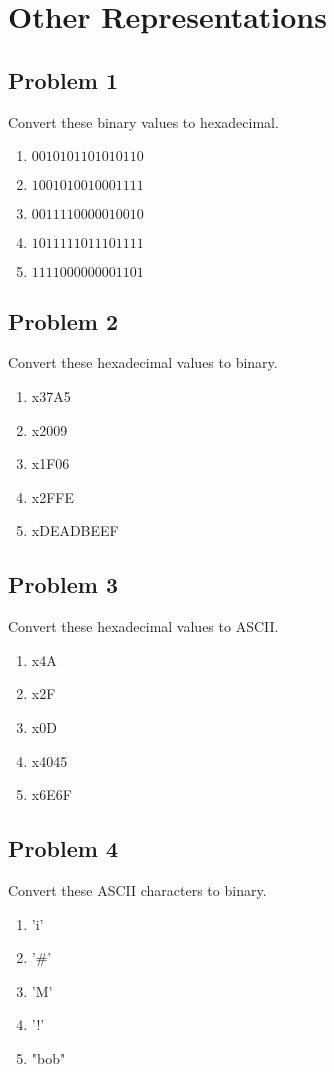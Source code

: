 \documentclass{article}
\begin{document}
\section*{Other Representations}
\subsection*{Problem 1}
Convert these binary values to hexadecimal.
\begin{enumerate}[label=\alph*.]
    \item $0010 1011 0101 0110$
    \item $1001 0100 1000 1111$
    \item $0011 1100 0001 0010$
    \item $1011 1110 1110 1111$
    \item $1111 0000 0000 1101$
\end{enumerate}

\subsection*{Problem 2}
Convert these hexadecimal values to binary.
\begin{enumerate}[label=\alph*.]
    \item x37A5
    \item x2009
    \item x1F06
    \item x2FFE
    \item xDEADBEEF
\end{enumerate}

\subsection*{Problem 3}
Convert these hexadecimal values to ASCII.
\begin{enumerate}[label=\alph*.]
    \item x4A
    \item x2F
    \item x0D
    \item x4045
    \item x6E6F
\end{enumerate}

\subsection*{Problem 4}
Convert these ASCII characters to binary.
\begin{enumerate}[label=\alph*.]
    \item 'i'
    \item '\#'
    \item 'M'
    \item '!'
    \item "bob"
\end{enumerate}
\end{document}
